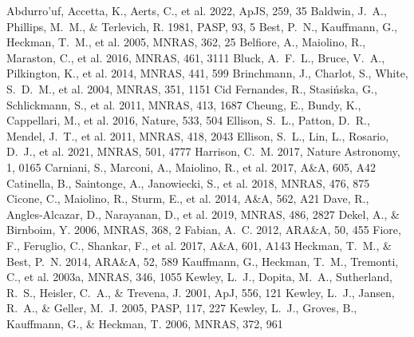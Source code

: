 \documentclass[twocolumn]{aastex631}
\begin{document}
\begin{thebibliography}{}
 Abdurro'uf, Accetta, K., Aerts, C., et al. 2022, ApJS, 259, 35
 Baldwin, J.~A., Phillips, M.~M., \& Terlevich, R. 1981, PASP, 93, 5
 Best, P.~N., Kauffmann, G., Heckman, T.~M., et al. 2005, MNRAS, 362, 25
 Belfiore, A., Maiolino, R., Maraston, C., et al. 2016, MNRAS, 461, 3111
 Bluck, A.~F.~L., Bruce, V.~A., Pilkington, K., et al. 2014, MNRAS, 441, 599
 Brinchmann, J., Charlot, S., White, S.~D.~M., et al. 2004, MNRAS, 351, 1151
 Cid Fernandes, R., Stasi{\'n}ska, G., Schlickmann, S., et al. 2011, MNRAS, 413, 1687
 Cheung, E., Bundy, K., Cappellari, M., et al. 2016, Nature, 533, 504
 Ellison, S.~L., Patton, D.~R., Mendel, J.~T., et al. 2011, MNRAS, 418, 2043
 Ellison, S.~L., Lin, L., Rosario, D.~J., et al. 2021, MNRAS, 501, 4777
 Harrison, C.~M. 2017, Nature Astronomy, 1, 0165
 Carniani, S., Marconi, A., Maiolino, R., et al. 2017, A\&A, 605, A42
 Catinella, B., Saintonge, A., Janowiecki, S., et al. 2018, MNRAS, 476, 875
 Cicone, C., Maiolino, R., Sturm, E., et al. 2014, A\&A, 562, A21
 Dave, R., Angles-Alcazar, D., Narayanan, D., et al. 2019, MNRAS, 486, 2827
 Dekel, A., \& Birnboim, Y. 2006, MNRAS, 368, 2
 Fabian, A.~C. 2012, ARA\&A, 50, 455
 Fiore, F., Feruglio, C., Shankar, F., et al. 2017, A\&A, 601, A143
 Heckman, T.~M., \& Best, P.~N. 2014, ARA\&A, 52, 589
 Kauffmann, G., Heckman, T.~M., Tremonti, C., et al. 2003a, MNRAS, 346, 1055
 Kewley, L.~J., Dopita, M.~A., Sutherland, R.~S., Heisler, C.~A., \& Trevena, J. 2001, ApJ, 556, 121
 Kewley, L.~J., Jansen, R.~A., \& Geller, M.~J. 2005, PASP, 117, 227
 Kewley, L.~J., Groves, B., Kauffmann, G., \& Heckman, T. 2006, MNRAS, 372, 961

\end{thebibliography}
\end{document}
